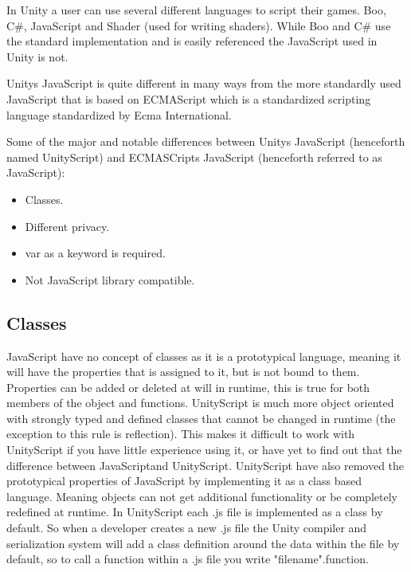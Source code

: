 In Unity a user can use several different languages to script their games. Boo, C\#, JavaScript and Shader (used for writing shaders).
While Boo and C\#  use the standard implementation and is easily referenced the JavaScript used in Unity is not.\cite{WikiScriptVSScript}

Unitys JavaScript is quite different in many ways from the more standardly used JavaScript that is based on ECMAScript\cite{ECMAscipt} which is a standardized scripting
language standardized by Ecma International.

Some of the major and notable differences between Unitys JavaScript (henceforth named UnityScript) and ECMASCripts JavaScript (henceforth referred to as JavaScript):

\begin{itemize}
	\item Classes.
	\item Different privacy.
	\item var as a keyword is required.
	\item Not JavaScript library compatible.
\end{itemize}

\subsection {Classes}
JavaScript have no concept of classes as it is a prototypical language, meaning it will have the properties that is assigned to it, but is not bound to them.
Properties can be added or deleted at will in runtime, this is true for both members of the object and functions. UnityScript is much more object oriented with strongly typed and defined classes that cannot be changed in runtime (the exception to this rule is reflection).
This makes it difficult to work with UnityScript if you have little experience using it, or have yet to find out that the difference between JavaScriptand UnityScript.
UnityScript have also removed the prototypical properties of JavaScript by implementing it as a class based language. Meaning objects can not get additional functionality or be completely redefined at runtime. In UnityScript each .js file is implemented as a class by default. So when a developer creates a new .js file the Unity compiler and serialization system will add a class definition around the data within the file by default, so to call a function within a .js file you write "filename".function.

